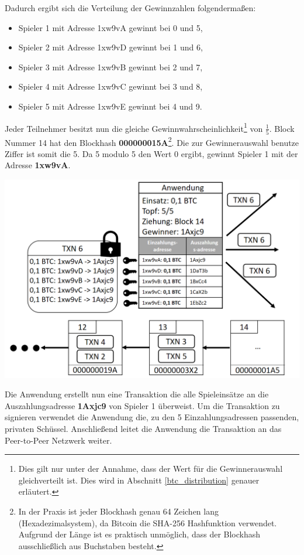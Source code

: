 \vspace{1cm}
Dadurch ergibt sich die Verteilung der Gewinnzahlen folgendermaßen:
\begin{itemize}
\item Spieler 1 mit Adresse 1xw9vA gewinnt bei 0 und 5,
\item Spieler 2 mit Adresse 1xw9vD gewinnt bei 1 und 6,
\item Spieler 3 mit Adresse 1xw9vB gewinnt bei 2 und 7,
\item Spieler 4 mit Adresse 1xw9vC gewinnt bei 3 und 8,
\item Spieler 5 mit Adresse 1xw9vE gewinnt bei 4 und 9.
\end{itemize}
Jeder Teilnehmer besitzt nun die gleiche Gewinnwahrscheinlichkeit\footnote{Dies gilt nur unter der Annahme, dass der Wert für die Gewinnerauswahl gleichverteilt ist. Dies wird in Abschnitt \ref{btc_distribution} genauer erläutert.} von $\frac{1}{5}$. Block Nummer 14 hat den Blockhash \textbf{000000015A}\footnote{In der Praxis ist jeder Blockhash genau 64 Zeichen lang (Hexadezimalsystem), da Bitcoin die SHA-256 Hashfunktion verwendet. Aufgrund der Länge ist es praktisch unmöglich, dass der Blockhash ausschließlich aus Buchstaben besteht.}. Die zur Gewinnerauswahl benutze Ziffer ist somit die 5. Da 5 modulo 5 den Wert 0 ergibt, gewinnt Spieler 1 mit der Adresse \textbf{1xw9vA}.

\vspace{1cm}
\begin{minipage}{0.55\textwidth}
\includegraphics[width=\textwidth]{Figures/konzept_btc/konzept11}
\centering
\decoRule
{}
\label{fig:konzept11}
\end{minipage}
\begin{minipage}{0.45\textwidth}
Die Anwendung erstellt nun eine Transaktion die alle Spieleinsätze an die Auszahlungsadresse \textbf{1Axjc9} von Spieler 1 überweist. Um die Transaktion zu signieren verwendet die Anwendung die, zu den 5 Einzahlungsadressen passenden, privaten Schüssel. Anschließend leitet die Anwendung die Transaktion an das Peer-to-Peer Netzwerk weiter.
\end{minipage}

